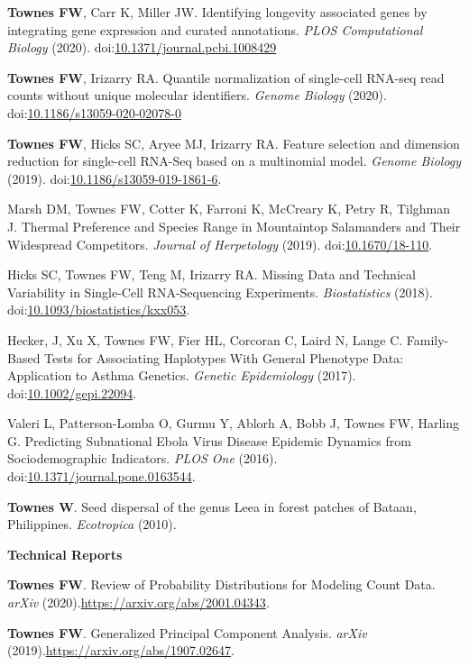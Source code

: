\documentclass[10pt]{article}
\newcommand\doilink[1]{\href{https://dx.doi.org/#1}{#1}}
\newcommand\doi[1]{doi:\doilink{#1}}
\newcommand\arxiv[1]{\url{https://arxiv.org/abs/#1}}
\begin{document}
\begin{enumerate}[label= {[\arabic*]}]
\item {\bf Townes FW}, Carr K, Miller JW. Identifying longevity associated genes by integrating gene expression and curated annotations. {\it PLOS Computational Biology} (2020). \newline \doi{10.1371/journal.pcbi.1008429}
\item {\bf Townes FW}, Irizarry RA. Quantile normalization of single-cell RNA-seq read counts without unique molecular identifiers. {\it Genome Biology} (2020). \doi{10.1186/s13059-020-02078-0}
\item {\bf Townes FW}, Hicks SC, Aryee MJ, Irizarry RA. Feature selection and dimension reduction for single-cell RNA-Seq based on a multinomial model. {\it Genome Biology} (2019). \doi{10.1186/s13059-019-1861-6}.
\item Marsh DM, Townes FW, Cotter K, Farroni K, McCreary K, Petry R, Tilghman J. Thermal Preference and Species Range in Mountaintop Salamanders and Their Widespread Competitors. {\it Journal of Herpetology} (2019). \doi{10.1670/18-110}.
\item Hicks SC, Townes FW, Teng M, Irizarry RA. Missing Data and Technical Variability in Single-Cell RNA-Sequencing Experiments. {\it Biostatistics} (2018). \doi{10.1093/biostatistics/kxx053}.
\item Hecker, J, Xu X, Townes FW, Fier HL, Corcoran C, Laird N, Lange C. Family-Based Tests for Associating Haplotypes With General Phenotype Data: Application to Asthma Genetics. {\it Genetic Epidemiology} (2017). \doi{10.1002/gepi.22094}.
\item Valeri L, Patterson-Lomba O, Gurmu Y, Ablorh A, Bobb J, Townes FW, Harling G. Predicting Subnational Ebola Virus Disease Epidemic Dynamics from Sociodemographic Indicators. {\it PLOS One} (2016). \doi{10.1371/journal.pone.0163544}.
\item {\bf Townes W}. Seed dispersal of the genus Leea in forest patches of Bataan, Philippines. {\it Ecotropica } (2010).
\end{enumerate}

\textbf{Technical Reports}
\begin{enumerate}[label= {[\arabic*]}]
\item {\bf Townes FW}. Review of Probability Distributions for Modeling Count Data. {\it arXiv} (2020).\newline \arxiv{2001.04343}.
\item {\bf Townes FW}. Generalized Principal Component Analysis. {\it arXiv} (2019).\newline \arxiv{1907.02647}.
\end{enumerate}
\end{document}
